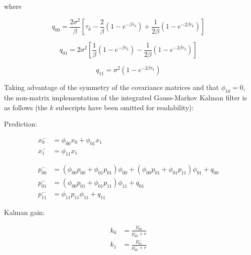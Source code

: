 \documentclass[12pt]{article}
\begin{document}
where

\begin{equation*}
    q_{00} = \frac{2 \sigma^2}{\beta}
        \left [
            \tau_k - \frac{2}{\beta} \left ( 1 - e^{- \beta \tau_k} \right )
                   + \frac{1}{2 \beta} \left ( 1 - e^{-2 \beta \tau_k} \right )
        \right ]
\end{equation*}

\begin{equation*}
    q_{01} = 2 \sigma^2
        \left [
            \frac{1}{\beta} \left ( 1 - e^{- \beta \tau_k} \right )
            - \frac{1}{2 \beta} \left ( 1 - e^{-2 \beta \tau_k} \right )
        \right ]
\end{equation*}

\begin{equation*}
    q_{11} = \sigma^2 \left ( 1 - e^{-2 \beta \tau_k} \right )
\end{equation*}

Taking advantage of the symmetry of the covariance matrices and that $\phi_{10} = 0$,
the non-matrix implementation of the integrated Gauss-Markov Kalman filter is as follows
(the $k$ subscripts have been omitted for readability):

Prediction:

\begin{equation*}
    \begin{aligned}
    x_0^- &= \phi_{00} x_0 + \phi_{01} x_1 \\
    x_1^- &= \phi_{11} x_1 \\
    \phantom{m} \\
    p_{00}^- &= (\phi_{00} p_{00} + \phi_{01} p_{01}) \phi_{00} + (\phi_{00} p_{01} + \phi_{01} p_{11}) \phi_{01} + q_{00} \\
    p_{01}^- &= (\phi_{00} p_{01} + \phi_{01} p_{11}) \phi_{11} + q_{01} \\
    p_{11}^- &= \phi_{11} p_{11} \phi_{11} + q_{11}
    \end{aligned}
\end{equation*}

Kalman gain:

\begin{equation*}
    \begin{aligned}
    k_0 &= \frac{p_{00}^-}{p_{00}^- + r} \\
    k_1 &= \frac{p_{01}^-}{p_{00}^- + r}
    \end{aligned}
\end{equation*}
\end{document}
